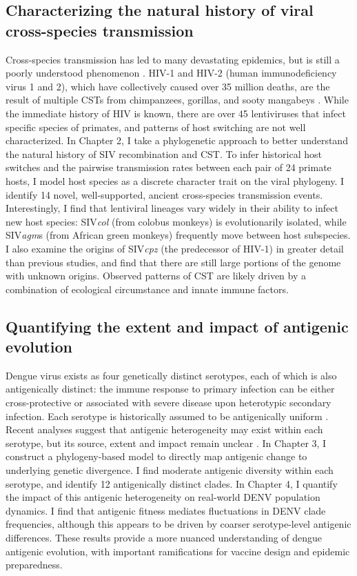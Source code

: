 \subsection{Characterizing the natural history of viral cross-species transmission}
Cross-species transmission has led to many devastating epidemics, but is still a poorly understood phenomenon \citep{parrish2008cross}.
HIV-1 and HIV-2 (human immunodeficiency virus 1 and 2), which have collectively caused over 35 million deaths, are the result of multiple CSTs from chimpanzees, gorillas, and sooty mangabeys \citep{sharp2011origins}.
While the immediate history of HIV is known, there are over 45 lentiviruses that infect specific species of primates, and patterns of host switching are not well characterized.
In Chapter 2, I take a phylogenetic approach to better understand the natural history of SIV recombination and CST.
To infer historical host switches and the pairwise transmission rates between each pair of 24 primate hosts, I model host species as a discrete character trait on the viral phylogeny.
I identify 14 novel, well-supported, ancient cross-species transmission events.
Interestingly, I find that lentiviral lineages vary widely in their ability to infect new host species: SIV\textit{col} (from colobus monkeys) is evolutionarily isolated, while SIV\textit{agm}s (from African green monkeys) frequently move between host subspecies.
I also examine the origins of SIV\textit{cpz} (the predecessor of HIV-1) in greater detail than previous studies, and find that there are still large portions of the genome with unknown origins.
Observed patterns of CST are likely driven by a combination of ecological circumstance and innate immune factors.

\subsection{Quantifying the extent and impact of antigenic evolution}
Dengue virus exists as four genetically distinct serotypes, each of which is also antigenically distinct: the immune response to primary infection can be either cross-protective or associated with severe disease upon heterotypic secondary infection.
Each serotype is historically assumed to be antigenically uniform \citep{twiddy2003inferring}.
Recent analyses suggest that antigenic heterogeneity may exist within each serotype, but its source, extent and impact remain unclear \citep{katzelnick2015dengue}.
In Chapter 3, I construct a phylogeny-based model to directly map antigenic change to underlying genetic divergence.
I find moderate antigenic diversity within each serotype, and identify 12 antigenically distinct clades.
In Chapter 4, I quantify the impact of this antigenic heterogeneity on real-world DENV population dynamics.
I find that antigenic fitness mediates fluctuations in DENV clade frequencies, although this appears to be driven by coarser serotype-level antigenic differences.
These results provide a more nuanced understanding of dengue antigenic evolution, with important ramifications for vaccine design and epidemic preparedness.

